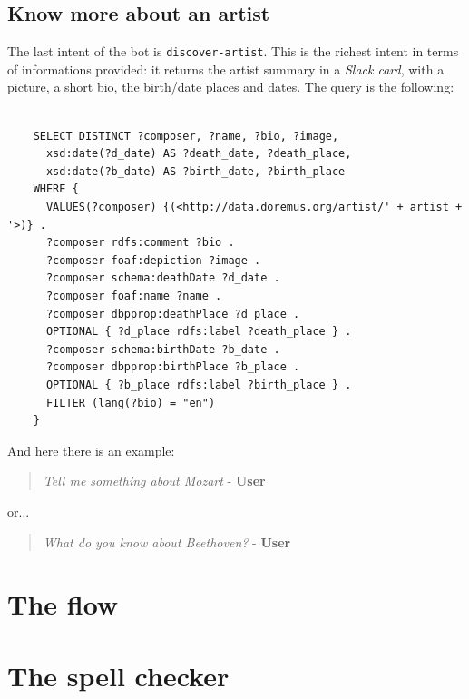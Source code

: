 \documentclass[a4paper,12pt]{report}
\begin{document}
	\subsection{Know more about an artist}
	The last intent of the bot is \texttt{discover-artist}. This is the richest intent in terms of informations provided: it returns the artist summary in a \textit{Slack card}, with a picture, a short bio, the birth/date places and dates.
	The query is the following:
	\begin{lstlisting}
	
	SELECT DISTINCT ?composer, ?name, ?bio, ?image,
	  xsd:date(?d_date) AS ?death_date, ?death_place,
	  xsd:date(?b_date) AS ?birth_date, ?birth_place
	WHERE {
	  VALUES(?composer) {(<http://data.doremus.org/artist/' + artist + '>)} .
	  ?composer rdfs:comment ?bio .
	  ?composer foaf:depiction ?image .
	  ?composer schema:deathDate ?d_date .
	  ?composer foaf:name ?name .
	  ?composer dbpprop:deathPlace ?d_place .
	  OPTIONAL { ?d_place rdfs:label ?death_place } .
	  ?composer schema:birthDate ?b_date .
	  ?composer dbpprop:birthPlace ?b_place .
	  OPTIONAL { ?b_place rdfs:label ?birth_place } .
	  FILTER (lang(?bio) = "en")
	}
	\end{lstlisting}
	And here there is an example:
	\begin{verse}
		\textit{Tell me something about Mozart} - \textbf{User}\\
	\end{verse}
	or...
	\begin{verse}
		\textit{What do you know about Beethoven?} - \textbf{User}\\
	\end{verse}

	\section{The flow}
	\section{The spell checker}
	
\end{document}
